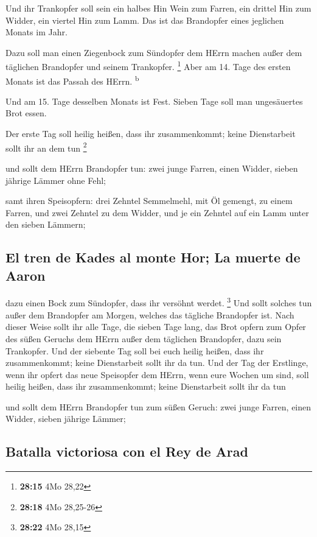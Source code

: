  Und ihr Trankopfer soll sein ein halbes Hin Wein zum
Farren, ein drittel Hin zum Widder, ein viertel Hin zum Lamm. Das ist
das Brandopfer eines jeglichen Monats im Jahr.

 Dazu soll man einen Ziegenbock zum Sündopfer dem HErrn
machen außer dem täglichen Brandopfer und seinem Trankopfer. \footnote{\textbf{28:15}
  4Mo 28,22}  Aber am 14. Tage des ersten Monats ist das
Passah des HErrn. \textsuperscript{b}

 Und am 15. Tage desselben Monats ist Fest. Sieben Tage
soll man ungesäuertes Brot essen.

 Der erste Tag soll heilig heißen, dass ihr
zusammenkommt; keine Dienstarbeit sollt ihr an dem tun \footnote{\textbf{28:18}
  4Mo 28,25-26}

 und sollt dem HErrn Brandopfer tun: zwei junge Farren,
einen Widder, sieben jährige Lämmer ohne Fehl;

 samt ihren Speisopfern: drei Zehntel Semmelmehl, mit Öl
gemengt, zu einem Farren, und zwei Zehntel zu dem Widder,
 und je ein Zehntel auf ein Lamm unter den sieben
Lämmern;

\hypertarget{el-tren-de-kades-al-monte-hor-la-muerte-de-aaron}{%
\subsection{El tren de Kades al monte Hor; La muerte de
Aaron}\label{el-tren-de-kades-al-monte-hor-la-muerte-de-aaron}}

 dazu einen Bock zum Sündopfer, dass ihr versöhnt werdet.
\footnote{\textbf{28:22} 4Mo 28,15}  Und sollt solches
tun außer dem Brandopfer am Morgen, welches das tägliche Brandopfer ist.
 Nach dieser Weise sollt ihr alle Tage, die sieben Tage
lang, das Brot opfern zum Opfer des süßen Geruchs dem HErrn außer dem
täglichen Brandopfer, dazu sein Trankopfer.  Und der
siebente Tag soll bei euch heilig heißen, dass ihr zusammenkommt; keine
Dienstarbeit sollt ihr da tun.  Und der Tag der
Erstlinge, wenn ihr opfert das neue Speisopfer dem HErrn, wenn eure
Wochen um sind, soll heilig heißen, dass ihr zusammenkommt; keine
Dienstarbeit sollt ihr da tun

 und sollt dem HErrn Brandopfer tun zum süßen Geruch:
zwei junge Farren, einen Widder, sieben jährige Lämmer;

\hypertarget{batalla-victoriosa-con-el-rey-de-arad}{%
\subsection{Batalla victoriosa con el Rey de
Arad}\label{batalla-victoriosa-con-el-rey-de-arad}}

